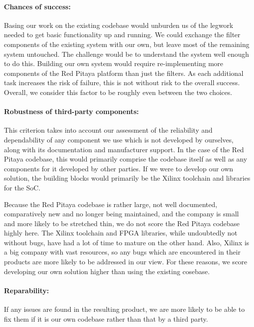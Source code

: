 \paragraph{Chances of success:} Basing our work on the existing codebase would
unburden  us  of  the  legwork  needed  to  get  basic  functionality  up  and
running. We could exchange  the filter components of the  existing system with
our own, but leave most of the remaining system untouched. The challenge would
be to understand the  system well enough to do this.   Building our own system
would require re-implementing more components  of the Red Pitaya platform than
just the filters. As each additional task  increases the risk of failure, this
is not without  risk to the overall success. Overall, we  consider this factor
to be roughly even between the two choices.

\paragraph{Robustness  of third-party  components:} This criterion  takes into
account our assessment  of the reliability and dependability  of any component
we use which  is not developed by ourselves, along  with its documentation and
manufacturer  support. In the  case of  the  Red Pitaya  codebase, this  would
primarily  comprise the  codebase  itself as  well as  any  components for  it
developed  by other  parties. If  we were  to develop  our  own solution,  the
building blocks would primarily be the  Xilinx toolchain and libraries for the
SoC.

Because  the  Red  Pitaya  codebase  is rather  large,  not  well  documented,
comparatively new and no longer being maintained, and the company is small and
more likely  to be  stretched thin, we  do not score  the Red  Pitaya codebase
highly here. The  Xilinx toolchain and  FPGA libraries, while  undoubtedly not
without bugs,  have had  a lot  of time to  mature on  the other  hand.  Also,
Xilinx is a big company with vast resources, so any bugs which are encountered
in  their products  are more  likely to  be addressed  in our  view. For these
reasons, we score  developing our own solution higher than  using the existing
cosebase.

\paragraph{Reparability:} If any issues are found in the resulting product, we
are more likely to  be able to fix them if it is  our own codebase rather than
that by a third party.

